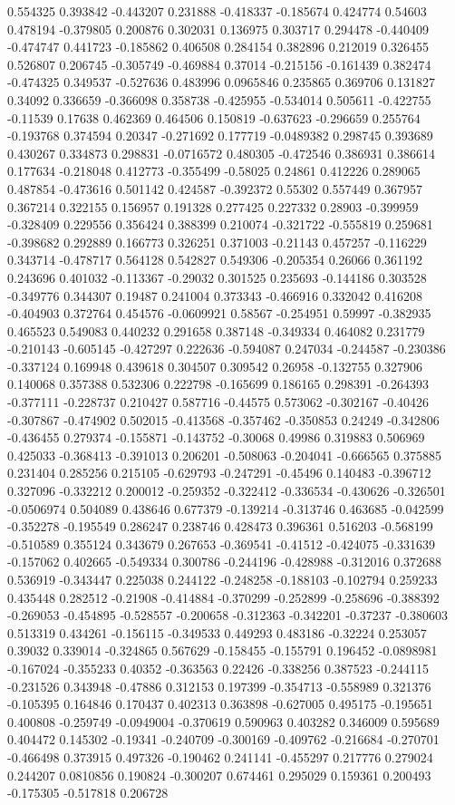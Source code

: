 0.554325 0.393842 -0.443207 0.231888 -0.418337 -0.185674 0.424774 0.54603 0.478194 -0.379805 0.200876 0.302031 0.136975 0.303717 0.294478 -0.440409 -0.474747 0.441723 -0.185862 0.406508 0.284154 0.382896 0.212019 0.326455 0.526807 0.206745 -0.305749 -0.469884 0.37014 -0.215156 -0.161439 0.382474 -0.474325 0.349537 -0.527636 0.483996 0.0965846 0.235865 0.369706 0.131827 0.34092 0.336659 -0.366098 0.358738 -0.425955 -0.534014 0.505611 -0.422755 -0.11539 0.17638 0.462369 0.464506 0.150819 -0.637623 -0.296659 0.255764 -0.193768 0.374594 0.20347 -0.271692 0.177719 -0.0489382 0.298745 0.393689 0.430267 0.334873 0.298831 -0.0716572 0.480305 -0.472546 0.386931 0.386614 0.177634 -0.218048 0.412773 -0.355499 -0.58025 0.24861 0.412226 0.289065 0.487854 -0.473616 0.501142 0.424587 -0.392372 0.55302 0.557449 0.367957 0.367214 0.322155 0.156957 0.191328 0.277425 0.227332 0.28903 -0.399959 -0.328409 0.229556 0.356424 0.388399 0.210074 -0.321722 -0.555819 0.259681 -0.398682 0.292889 0.166773 0.326251 0.371003 -0.21143 0.457257 -0.116229 0.343714 -0.478717 0.564128 0.542827 0.549306 -0.205354 0.26066 0.361192 0.243696 0.401032 -0.113367 -0.29032 0.301525 0.235693 -0.144186 0.303528 -0.349776 0.344307 0.19487 0.241004 0.373343 -0.466916 0.332042 0.416208 -0.404903 0.372764 0.454576 -0.0609921 0.58567 -0.254951 0.59997 -0.382935 0.465523 0.549083 0.440232 0.291658 0.387148 -0.349334 0.464082 0.231779 -0.210143 -0.605145 -0.427297 0.222636 -0.594087 0.247034 -0.244587 -0.230386 -0.337124 0.169948 0.439618 0.304507 0.309542 0.26958 -0.132755 0.327906 0.140068 0.357388 0.532306 0.222798 -0.165699 0.186165 0.298391 -0.264393 -0.377111 -0.228737 0.210427 0.587716 -0.44575 0.573062 -0.302167 -0.40426 -0.307867 -0.474902 0.502015 -0.413568 -0.357462 -0.350853 0.24249 -0.342806 -0.436455 0.279374 -0.155871 -0.143752 -0.30068 0.49986 0.319883 0.506969 0.425033 -0.368413 -0.391013 0.206201 -0.508063 -0.204041 -0.666565 0.375885 0.231404 0.285256 0.215105 -0.629793 -0.247291 -0.45496 0.140483 -0.396712 0.327096 -0.332212 0.200012 -0.259352 -0.322412 -0.336534 -0.430626 -0.326501 -0.0506974 0.504089 0.438646 0.677379 -0.139214 -0.313746 0.463685 -0.042599 -0.352278 -0.195549 0.286247 0.238746 0.428473 0.396361 0.516203 -0.568199 -0.510589 0.355124 0.343679 0.267653 -0.369541 -0.41512 -0.424075 -0.331639 -0.157062 0.402665 -0.549334 0.300786 -0.244196 -0.428988 -0.312016 0.372688 0.536919 -0.343447 0.225038 0.244122 -0.248258 -0.188103 -0.102794 0.259233 0.435448 0.282512 -0.21908 -0.414884 -0.370299 -0.252899 -0.258696 -0.388392 -0.269053 -0.454895 -0.528557 -0.200658 -0.312363 -0.342201 -0.37237 -0.380603 0.513319 0.434261 -0.156115 -0.349533 0.449293 0.483186 -0.32224 0.253057 0.39032 0.339014 -0.324865 0.567629 -0.158455 -0.155791 0.196452 -0.0898981 -0.167024 -0.355233 0.40352 -0.363563 0.22426 -0.338256 0.387523 -0.244115 -0.231526 0.343948 -0.47886 0.312153 0.197399 -0.354713 -0.558989 0.321376 -0.105395 0.164846 0.170437 0.402313 0.363898 -0.627005 0.495175 -0.195651 0.400808 -0.259749 -0.0949004 -0.370619 0.590963 0.403282 0.346009 0.595689 0.404472 0.145302 -0.19341 -0.240709 -0.300169 -0.409762 -0.216684 -0.270701 -0.466498 0.373915 0.497326 -0.190462 0.241141 -0.455297 0.217776 0.279024 0.244207 0.0810856 0.190824 -0.300207 0.674461 0.295029 0.159361 0.200493 -0.175305 -0.517818 0.206728 